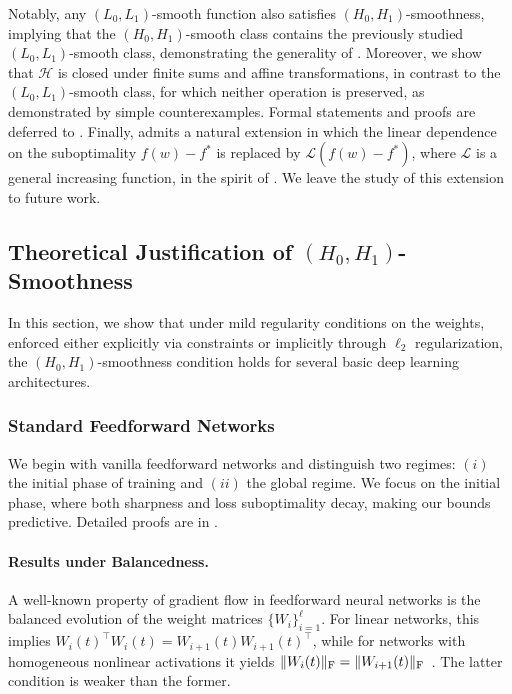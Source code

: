 \documentclass[a4paper,11pt]{article}
\newcommand{\cH}{\mathcal{H}}
\newcommand{\cL}{\mathcal{L}}
\newcommand{\1}{\mathbbm{1}}
\theoremstyle{plain}
\begin{document}
Notably, any $(L_0, L_1)$-smooth function also satisfies $(H_0, H_1)$-smoothness, implying that the $(H_0, H_1)$-smooth class contains the previously studied $(L_0, L_1)$-smooth class, demonstrating the generality of . Moreover, we show that $\cH$ is closed under finite sums and affine transformations, in contrast to the $(L_0, L_1)$-smooth class, for which neither operation is preserved, as demonstrated by simple counterexamples. Formal statements and proofs are deferred to . Finally,  admits a natural extension in which the linear dependence on the suboptimality $f(w)-f^*$ is replaced by $\cL(f(w)-f^*)$, where $\cL$ is a general increasing function, in the spirit of \citet{li2023convex}. We leave the study of this extension to future work. 

 

\subsection{Theoretical Justification of $(H_0,H_1)$-Smoothness}

In this section, we show that under mild regularity conditions on the weights, enforced either explicitly via constraints or implicitly through $\ell_2$ regularization, the $(H_0, H_1)$-smoothness condition holds for several basic deep learning architectures. 

\subsubsection{Standard Feedforward Networks}
\label{sec:theory_MLP}

We begin with vanilla feedforward networks and distinguish two regimes: $(i)$ the initial phase of training and $(ii)$ the global regime. We focus on the initial phase, where both sharpness and loss suboptimality decay, making our bounds predictive. Detailed proofs are in .




 
\paragraph{Results under Balancedness.} 
A well-known property of gradient flow in feedforward neural networks is the balanced evolution of the weight matrices $\{W_i\}_{i=1}^{\ell}$. For linear networks, this implies $W_i(t)^\top W_i(t) = W_{i+1}(t) W_{i+1}(t)^\top$, while for networks with homogeneous nonlinear activations it yields $\|W_i(t)\|_{\rm F} = \|W_{i+1}(t)\|_{\rm F}$~\citep[Theorem~2.2 and Corollary~2.1]{du2018algorithmic}. The latter condition is weaker than the former.
\end{document}
